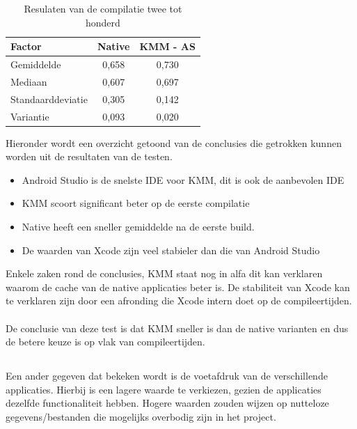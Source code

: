 \begin{table}[H]
    \centering
    \caption{Resulaten van de compilatie twee tot honderd}
    \begin{tabular}{|l|c|c|}
        \hline
        {\textbf{Factor}} & {\textbf{Native}}  & {\textbf{KMM - AS}}\\ \hline \hline
        Gemiddelde&0,658&0,730\\ \hline
        Mediaan&0,607&0,697\\ \hline
        Standaarddeviatie&0,305&0,142\\ \hline
        Variantie&0,093&0,020\\ \hline
    \end{tabular}
    \label{T:compileer-andere-overzicht}
\end{table}

Hieronder wordt een overzicht getoond van de conclusies die getrokken kunnen worden uit de resultaten van de testen.
\begin{itemize}
    \item Android Studio is de snelste IDE voor KMM, dit is ook de aanbevolen IDE
    \item KMM scoort significant beter op de eerste compilatie
    \item Native heeft een sneller gemiddelde na de eerste build.
    \item De waarden van Xcode zijn veel stabieler dan die van Android Studio
\end{itemize}
Enkele zaken rond de conclusies, KMM staat nog in alfa dit kan verklaren waarom de cache van de native applicaties beter is. De stabiliteit van Xcode kan te verklaren zijn door een afronding die Xcode intern doet op de compileertijden.
\\ \\ 
De conclusie van deze test is dat KMM sneller is dan de native varianten en dus de betere keuze is op vlak van compileertijden.


\subsection{}
\label{sec:M-test-voetafdruk}
Een ander gegeven dat bekeken wordt is de voetafdruk van de verschillende applicaties. Hierbij is een lagere waarde te verkiezen,  gezien de applicaties dezelfde functionaliteit hebben. Hogere waarden zouden wijzen op nutteloze gegevens/bestanden die mogelijks overbodig zijn in het project.


